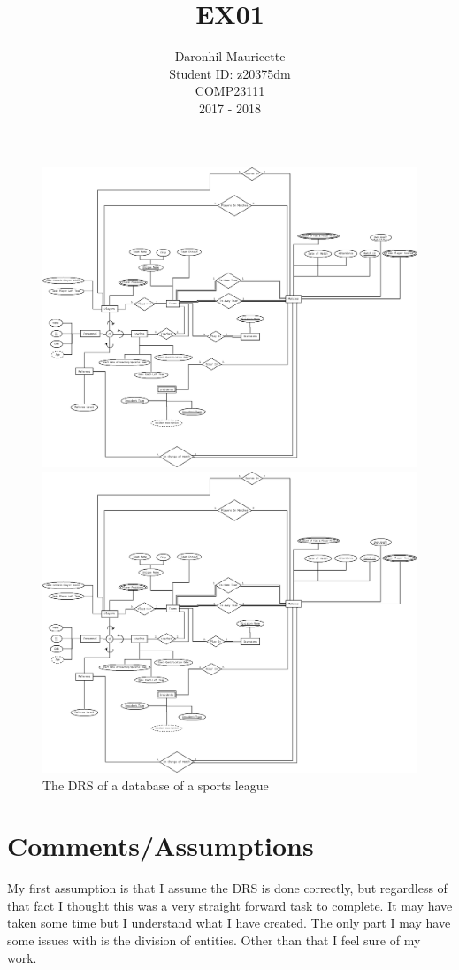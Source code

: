 \documentclass[16pt]{article}
\title{EX01}
\date{}
\author{        Daronhil Mauricette \\
                Student ID: z20375dm \\
		COMP23111 \\
		2017 - 2018 }
\begin{document}
\maketitle
\newpage

\begin{figure}
  \centering
  \includegraphics[scale=1,bb=0 0 30 30]{EX01-z20375dm.png}
  \centerline{\includegraphics[width=17cm]{EX01-z20375dm.png}}
  \caption{The DRS of a database of a sports league}
  \label{fig:DRS1}
\end{figure}

\newpage
\section{Comments/Assumptions}
My first assumption is that I assume the DRS is done correctly, but regardless
of that fact I thought this was a very straight forward task to complete. It
may have taken some time but I understand what I have created. The only part I 
may have some issues with is the division of entities. Other than that I feel 
sure of my work.
\end{document}
